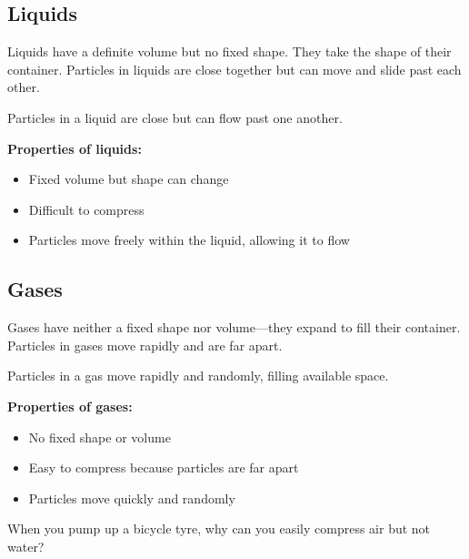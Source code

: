 \subsection{Liquids}

Liquids have a definite volume but no fixed shape. They take the shape of their container. Particles in liquids are close together but can move and slide past each other.

\begin{marginfigure}
\caption{Particles in a liquid are close but can flow past one another.}
\end{marginfigure}

\textbf{Properties of liquids:}
\begin{itemize}
    \item Fixed volume but shape can change
    \item Difficult to compress
    \item Particles move freely within the liquid, allowing it to flow
\end{itemize}

\subsection{Gases}

Gases have neither a fixed shape nor volume—they expand to fill their container. Particles in gases move rapidly and are far apart.

\begin{marginfigure}
\caption{Particles in a gas move rapidly and randomly, filling available space.}
\end{marginfigure}

\textbf{Properties of gases:}
\begin{itemize}
    \item No fixed shape or volume
    \item Easy to compress because particles are far apart
    \item Particles move quickly and randomly
\end{itemize}

\begin{stopandthink}
When you pump up a bicycle tyre, why can you easily compress air but not water?
\end{stopandthink}

